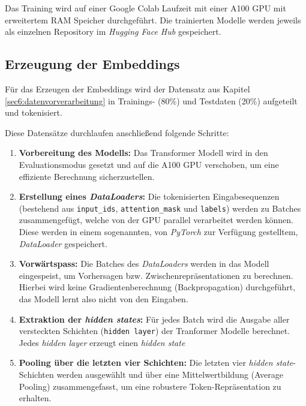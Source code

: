 Das Training wird auf einer Google Colab Laufzeit mit einer A100 GPU mit erweitertem RAM Speicher durchgeführt.
Die trainierten Modelle werden jeweils als einzelnen Repository im \textit{Hugging Face Hub} gespeichert.

\subsection{Erzeugung der Embeddings}

Für das Erzeugen der Embeddings wird der Datensatz aus Kapitel \ref{sec6:datenvorverarbeitung} in Trainings- (80\%) und Testdaten (20\%) aufgeteilt und tokenisiert.

Diese Datensätze durchlaufen anschließend folgende Schritte: 

\begin{enumerate}
  \item \textbf{Vorbereitung des Modells:}  
  Das Transformer Modell wird in den Evaluationsmodus gesetzt und auf die A100 GPU verschoben, um eine effiziente Berechnung sicherzustellen.

  \item \textbf{Erstellung eines \textit{DataLoaders}:}  
    Die tokenisierten Eingabesequenzen (bestehend aus \texttt{input\_ids}, \texttt{attention\_mask} und \texttt{labels}) werden zu Batches zusammengefügt,
    welche von der GPU parallel verarbeitet werden können. Diese werden in einem sogenannten, von \textit{PyTorch} zur Verfügung gestelltem, \textit{DataLoader} gespeichert.

  \item \textbf{Vorwärtspass:}  
  Die Batches des \textit{DataLoaders} werden in das Modell eingespeist, um Vorhersagen bzw. Zwischenrepräsentationen zu berechnen.
  Hierbei wird keine Gradientenberechnung (Backpropagation) durchgeführt, das Modell lernt also nicht von den Eingaben.

  \item \textbf{Extraktion der \textit{hidden states}:}  
  Für jedes Batch wird die Ausgabe aller versteckten Schichten (\texttt{hidden layer}) der Tranformer Modelle berechnet. 
  Jedes \textit{hidden layer} erzeugt einen \textit{hidden state}

  \item \textbf{Pooling über die letzten vier Schichten:}  
  Die letzten vier \textit{hidden state}-Schichten werden ausgewählt und über eine Mittelwertbildung (Average Pooling) zusammengefasst, 
  um eine robustere Token-Repräsentation zu erhalten.


\end{enumerate}
